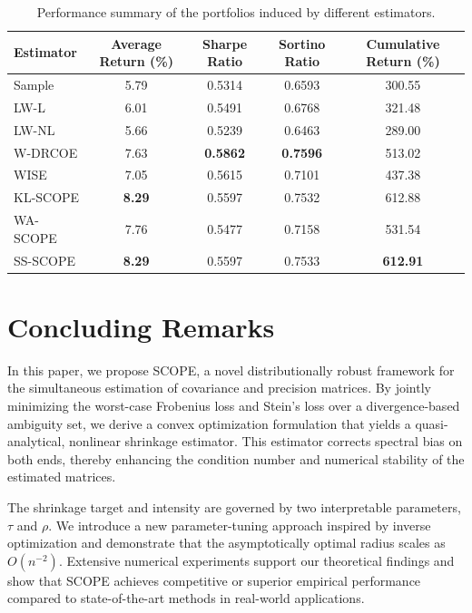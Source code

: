 \documentclass[11pt]{article}
\begin{document}
\begin{table}[htbp]
\centering
\begin{tabular}{lcccc}
\hline
Estimator & Average Return (\%) & Sharpe Ratio & Sortino Ratio & Cumulative Return (\%) \\
\hline
Sample    & 5.79 & 0.5314 & 0.6593 & 300.55 \\
LW-L      & 6.01 & 0.5491 & 0.6768 & 321.48 \\
LW-NL     & 5.66 & 0.5239 & 0.6463 & 289.00 \\
W-DRCOE   & 7.63 & \textbf{0.5862} & \textbf{0.7596} & 513.02 \\
WISE  & 7.05 & 0.5615 & 0.7101 & 437.38 \\
KL-SCOPE    & \textbf{8.29} & 0.5597 & 0.7532 & 612.88 \\
WA-SCOPE    & 7.76 & 0.5477 & 0.7158 & 531.54 \\
SS-SCOPE    & \textbf{8.29} & 0.5597 & 0.7533 & \textbf{612.91} \\
\hline
\end{tabular}
\caption{Performance summary of the portfolios induced by different estimators.}
\label{tab:industry}
\end{table}

\section{Concluding Remarks}


In this paper, we propose SCOPE, a novel distributionally robust framework for the simultaneous estimation of covariance and precision matrices. By jointly minimizing the worst-case Frobenius loss and Stein’s loss over a divergence-based ambiguity set, we derive a convex optimization formulation that yields a quasi-analytical, nonlinear shrinkage estimator. This estimator corrects spectral bias on both ends, thereby enhancing the condition number and numerical stability of the estimated matrices.

The shrinkage target and intensity are governed by two interpretable parameters, $\tau$ and $\rho$. We introduce a new parameter-tuning approach inspired by inverse optimization and demonstrate that the asymptotically optimal radius scales as $O(n^{-2})$. Extensive numerical experiments support our theoretical findings and show that SCOPE achieves competitive or superior empirical performance compared to state-of-the-art methods in real-world applications.
\end{document}
